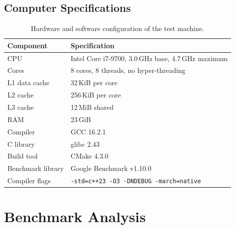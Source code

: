 \documentclass{article}
\theoremstyle{definition}
\begin{document}
\subsection{Computer Specifications}
\begin{table}[H]
    \centering
    \caption{Hardware and software configuration of the test machine.}
    \label{tab:hardware}
    \begin{tabular}{ll}
        \toprule
        \textbf{Component} & \textbf{Specification} \\
        \midrule
        CPU               & Intel Core i7-9700, 3.0\,GHz base, 4.7\,GHz maximum \\
        Cores             & 8 cores, 8 threads, no hyper-threading \\
        L1 data cache     & 32\,KiB per core \\
        L2 cache          & 256\,KiB per core \\
        L3 cache          & 12\,MiB shared \\
        RAM               & 23\,GiB \\
        \midrule
        Compiler          & GCC 16.2.1 \\
        C library         & glibc 2.43 \\
        Build tool        & CMake 4.3.0 \\
        Benchmark library & Google Benchmark v1.10.0 \\
        Compiler flags    & \texttt{-std=c++23 -O3 -DNDEBUG -march=native} \\
        \bottomrule
    \end{tabular}
\end{table}

\section{Benchmark Analysis}
\begin{table}[H]
    \centering
    \small
    \caption{}
    \label{tab:theory}
\end{table}
\end{document}

